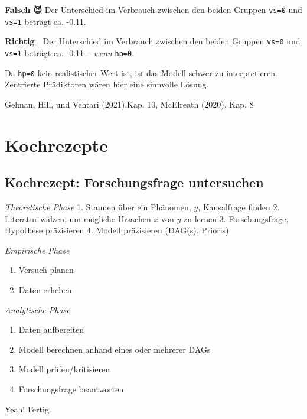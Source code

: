 \documentclass[
  a4paper,
  DIV=11]{scrreprt}
\providecommand{\tightlist}{%
  \setlength{\itemsep}{0pt}\setlength{\parskip}{0pt}}\usepackage{longtable,booktabs,array}
\theoremstyle{definition}
\theoremstyle{remark}
\begin{document}
\textbf{Falsch 😈} Der Unterschied im Verbrauch zwischen den beiden
Gruppen \texttt{vs=0} und \texttt{vs=1} beträgt ca. -0.11.

\textbf{Richtig 👼} Der Unterschied im Verbrauch zwischen den beiden
Gruppen \texttt{vs=0} und \texttt{vs=1} beträgt ca. -0.11 -- \emph{wenn}
\texttt{hp=0}.

Da \texttt{hp=0} kein realistischer Wert ist, ist das Modell schwer zu
interpretieren. Zentrierte Prädiktoren wären hier eine sinnvolle Lösung.

Gelman, Hill, und Vehtari (2021),Kap. 10, McElreath (2020), Kap. 8

\hypertarget{kochrezepte}{%
\section{Kochrezepte 🍲}\label{kochrezepte}}

\hypertarget{kochrezept-forschungsfrage-untersuchen}{%
\subsection{Kochrezept: Forschungsfrage
untersuchen}\label{kochrezept-forschungsfrage-untersuchen}}

\emph{Theoretische Phase} 1. Staunen über ein Phänomen, \(y\),
Kausalfrage finden 2. Literatur wälzen, um mögliche Ursachen \(x\) von
\(y\) zu lernen 3. Forschungsfrage, Hypothese präzisieren 4. Modell
präzisieren (DAG(s), Prioris)

\emph{Empirische Phase}

\begin{enumerate}
\def\labelenumi{\arabic{enumi}.}
\setcounter{enumi}{4}
\tightlist
\item
  Versuch planen
\item
  Daten erheben
\end{enumerate}

\emph{Analytische Phase}

\begin{enumerate}
\def\labelenumi{\arabic{enumi}.}
\setcounter{enumi}{6}
\tightlist
\item
  Daten aufbereiten
\item
  Modell berechnen anhand eines oder mehrerer DAGs
\item
  Modell prüfen/kritisieren
\item
  Forschungsfrage beantworten
\end{enumerate}

Yeah! Fertig.
\end{document}
